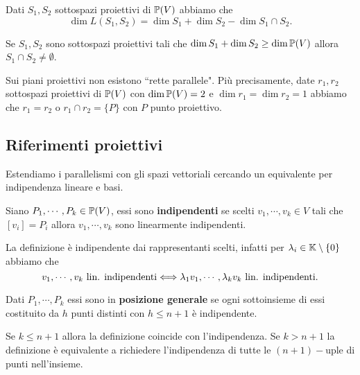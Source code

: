 \begin{multicols*}{2}
    \begin{theorem}
        Dati $S_1,S_2$ sottospazi proiettivi di ${\mathbb{P}(V)}$ abbiamo che
        \[\dim L(S_1,S_2)=\dim S_1+\dim S_2-\dim S_1\cap S_2.\]
    \end{theorem}
    \begin{corollary}
    Se $S_1,S_2$ sono sottospazi proiettivi tali che $\dim S_1+\dim S_2\geq\dim {\mathbb{P}(V)}$ allora $S_1\cap S_2\neq\emptyset$.
    \end{corollary}
    \begin{remark}
        Sui piani proiettivi non esistono ``rette parallele". Più precisamente, date $r_1,r_2$ sottospazi proiettivi di ${\mathbb{P}(V)}$ con $\dim {\mathbb{P}(V)}=2$ e $\dim r_1=\dim r_2=1$ abbiamo che $r_1=r_2$ o $r_1\cap r_2=\{P\}$ con $P$ punto proiettivo.
    \end{remark}

    \subsection{Riferimenti proiettivi}
    Estendiamo i parallelismi con gli spazi vettoriali cercando un equivalente per indipendenza lineare e basi.

    \begin{definition}
    Siano $P_1,\cdots,P_k\in{\mathbb{P}(V)}$, essi sono \textbf{indipendenti} se scelti $v_1,\cdots,v_k\in V$ tali che $[v_i]=P_i$ allora $v_1,\cdots,v_k$ sono linearmente indipendenti.
    \medskip

    \noindent
    La definizione \`e indipendente dai rappresentanti scelti, infatti per $\lambda_i\in\mathbb{K}\setminus\{0\}$ abbiamo che
    \[v_1,\cdots,v_k\text{ lin. indipendenti}\Longleftrightarrow \lambda_1v_1,\cdots,\lambda_kv_k\text{ lin. indipendenti}.\]
    \end{definition}

    \begin{definition}
    Dati $P_1,\cdots,P_k$ essi sono in \textbf{posizione generale} se ogni sottoinsieme di essi costituito da $h$ punti distinti con $h\leq n+1$ \`e indipendente.
    \end{definition}
    \begin{remark}
    Se $k\leq n+1$ allora la definizione coincide con l'indipendenza. Se $k>n+1$ la definizione \`e equivalente a richiedere l'indipendenza di tutte le $(n+1)-$uple di punti nell'insieme.
    \end{remark}


\end{multicols*}
